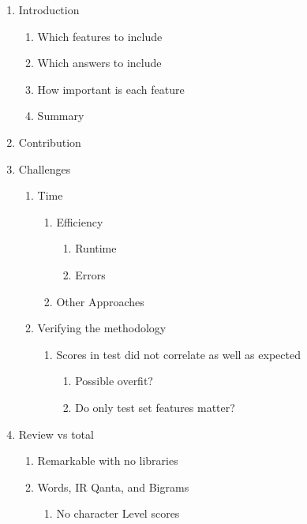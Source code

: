 \documentclass[11pt]{article}
\begin{document}
\begin{enumerate}

\item Introduction
	\begin{enumerate}
		\item Which features to include
		\item Which answers to include
		\item How important is each feature
		\item Summary
	\end{enumerate}

\item Contribution

\item Challenges
\begin{enumerate}

	\item Time
		\begin{enumerate}
			\item Efficiency
				\begin{enumerate}
					\item Runtime
					\item Errors
				\end{enumerate}
			\item Other Approaches
		\end{enumerate}

	\item Verifying the methodology
		\begin{enumerate}
			\item Scores in test did not correlate as well as expected
				\begin{enumerate}
					\item Possible overfit?
					\item Do only test set features matter?
				\end{enumerate}
		\end{enumerate}
	\end{enumerate}


	\item Review vs total
		\begin{enumerate}
			\item Remarkable with no libraries
			\item Words, IR Qanta, and Bigrams
				\begin{enumerate}
					\item No character Level scores
				\end{enumerate}
		\end{enumerate}


\end{enumerate}
\end{document}

